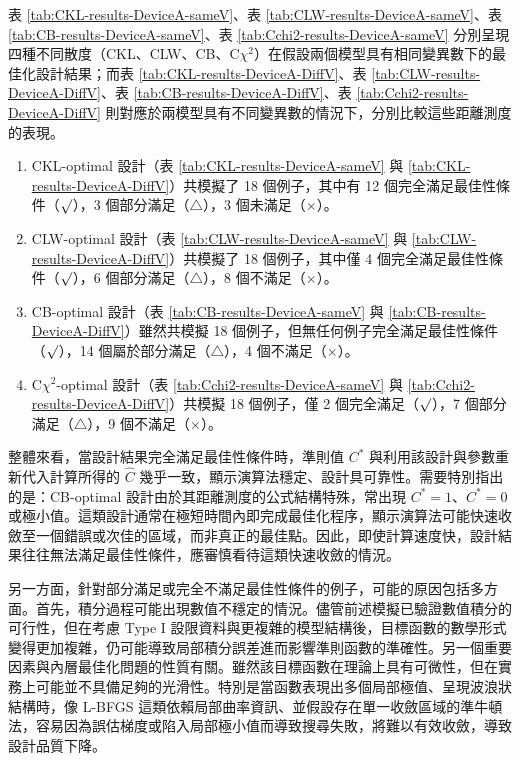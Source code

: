 \hspace*{8mm} 表 \ref{tab:CKL-results-DeviceA-sameV}、表 \ref{tab:CLW-results-DeviceA-sameV}、表 \ref{tab:CB-results-DeviceA-sameV}、表 \ref{tab:Cchi2-results-DeviceA-sameV} 分別呈現四種不同散度（CKL、CLW、CB、C$\chi^2$）在假設兩個模型具有相同變異數下的最佳化設計結果；而表 \ref{tab:CKL-results-DeviceA-DiffV}、表 \ref{tab:CLW-results-DeviceA-DiffV}、表 \ref{tab:CB-results-DeviceA-DiffV}、表 \ref{tab:Cchi2-results-DeviceA-DiffV} 則對應於兩模型具有不同變異數的情況下，分別比較這些距離測度的表現。

\begin{enumerate}
\item CKL-optimal 設計（表 \ref{tab:CKL-results-DeviceA-sameV} 與 \ref{tab:CKL-results-DeviceA-DiffV}）共模擬了 18 個例子，其中有 12 個完全滿足最佳性條件（$\surd$），3 個部分滿足（$\triangle$），3 個未滿足（$\times$）。
\item CLW-optimal 設計（表 \ref{tab:CLW-results-DeviceA-sameV} 與 \ref{tab:CLW-results-DeviceA-DiffV}）共模擬了 18 個例子，其中僅 4 個完全滿足最佳性條件（$\surd$），6 個部分滿足（$\triangle$），8 個不滿足（$\times$）。
\item CB-optimal 設計（表 \ref{tab:CB-results-DeviceA-sameV} 與 \ref{tab:CB-results-DeviceA-DiffV}）雖然共模擬 18 個例子，但無任何例子完全滿足最佳性條件（$\surd$），14 個屬於部分滿足（$\triangle$），4 個不滿足（$\times$）。
\item C$\chi^2$-optimal 設計（表 \ref{tab:Cchi2-results-DeviceA-sameV} 與 \ref{tab:Cchi2-results-DeviceA-DiffV}）共模擬 18 個例子，僅 2 個完全滿足（$\surd$），7 個部分滿足（$\triangle$），9 個不滿足（$\times$）。
\end{enumerate}

\hspace*{8mm} 整體來看，當設計結果完全滿足最佳性條件時，準則值 $C^*$ 與利用該設計與參數重新代入計算所得的 $\hat{C}$ 幾乎一致，顯示演算法穩定、設計具可靠性。需要特別指出的是：CB-optimal 設計由於其距離測度的公式結構特殊，常出現 $C^*=1$、$C^*=0$ 或極小值。這類設計通常在極短時間內即完成最佳化程序，顯示演算法可能快速收斂至一個錯誤或次佳的區域，而非真正的最佳點。因此，即使計算速度快，設計結果往往無法滿足最佳性條件，應審慎看待這類快速收斂的情況。

\hspace*{8mm} 另一方面，針對部分滿足或完全不滿足最佳性條件的例子，可能的原因包括多方面。首先，積分過程可能出現數值不穩定的情況。儘管前述模擬已驗證數值積分的可行性，但在考慮 Type I 設限資料與更複雜的模型結構後，目標函數的數學形式變得更加複雜，仍可能導致局部積分誤差進而影響準則函數的準確性。另一個重要因素與內層最佳化問題的性質有關。雖然該目標函數在理論上具有可微性，但在實務上可能並不具備足夠的光滑性。特別是當函數表現出多個局部極值、呈現波浪狀結構時，像 L-BFGS 這類依賴局部曲率資訊、並假設存在單一收斂區域的準牛頓法，容易因為誤估梯度或陷入局部極小值而導致搜尋失敗，將難以有效收斂，導致設計品質下降。

